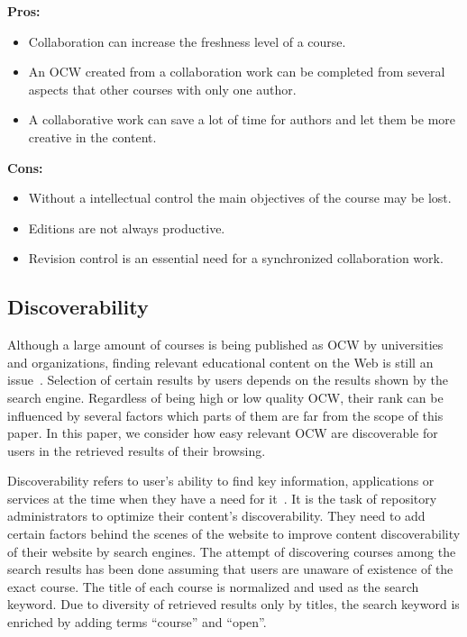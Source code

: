 \documentclass{sig-alternate}
\theoremstyle{definition}
\begin{document}
\noindent\textbf{Pros:}
\begin{itemize}
\item Collaboration can increase the freshness level of a course.
\item An OCW created from a collaboration work can be completed from several aspects that other courses with only one author.
\item A collaborative work can save a lot of time for authors and let them be more creative in the content.
\end{itemize}
\noindent\textbf{Cons:}
\begin{itemize}
\item Without a intellectual control the main objectives of the course may be lost.
\item Editions are not always productive.
\item Revision control is an essential need for a synchronized collaboration work.
\end{itemize}

\subsection{Discoverability}
\label{sec:Discoverability}
Although a large amount of courses is being published as OCW by universities and organizations, finding relevant educational content on the Web is still an issue~\parencite{Dichev.2011}.
Selection of certain results by users depends on the results shown by the search engine.
Regardless of being high or low quality OCW, their rank can be influenced by several factors which parts of them are far from the scope of this paper.
In this paper, we consider how easy relevant OCW are discoverable for users in the retrieved results of their browsing.

Discoverability refers to user's ability to find key information, applications or services at the time when they have a need for it~\parencite{Vladoiu.2013}.
It is the task of repository administrators to optimize their content’s discoverability.
They need to add certain factors behind the scenes of the website to improve content discoverability of their website by search engines.
The attempt of discovering courses among the search results has been done assuming that users are unaware of existence of the exact course.
The title of each course is normalized  and used as the search keyword.
Due to diversity of retrieved results only by titles, the search keyword is enriched by adding terms ``course'' and ``open''.
\end{document}
